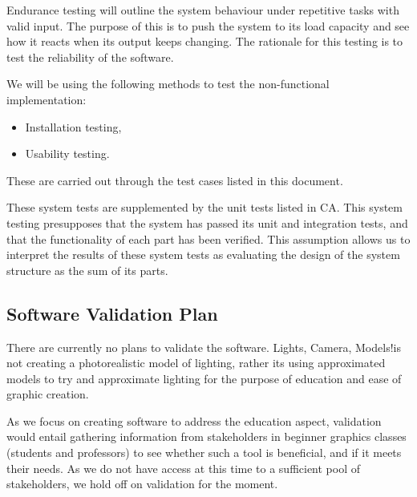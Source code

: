 \documentclass[12pt, titlepage]{article}
\newcommand{\famname}{Lights, Camera, Models!}
\begin{document}
Endurance testing will outline the system behaviour under repetitive tasks with 
valid input. The purpose of this is to push the system to its load capacity and 
see how it reacts when its output keeps changing. The rationale for this 
testing is to test the reliability of the software.

We will be using the following methods to test the non-functional 
implementation:

\begin{itemize}
	\item Installation testing,
	\item Usability testing.
\end{itemize}

These are carried out through the test cases listed in this document.

These system tests are supplemented by the unit tests listed in CA. 
This system testing presupposes that the system has passed its unit and 
integration tests, and that the functionality of each part has been verified. 
This assumption allows us to interpret the results of these system tests as 
evaluating the design of the system structure as the sum of its parts.


\subsection{Software Validation Plan}
There are currently no plans to validate the software. \famname is not creating 
a photorealistic model of lighting, rather its using approximated models to try 
and approximate lighting for the purpose of education and ease of graphic 
creation.

As we focus on creating software to address the education aspect, validation 
would entail gathering information from stakeholders in beginner graphics 
classes (students and professors) to see whether such a tool is beneficial, and 
if it meets their needs. As we do not have access at this time to a sufficient 
pool of stakeholders, we hold off on validation for the moment.

\end{document}
